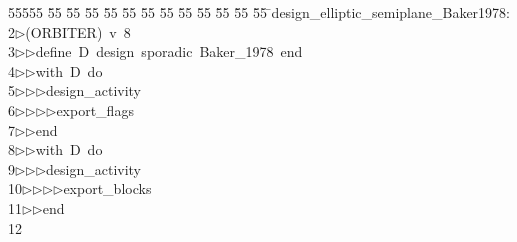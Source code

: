 %
%
\begin{tabbing}
55555 \= 55 \= 55 \= 55 \= 55 \= 55 \= 55 \= 55 \= 55 \= 55 \= 55 \= 55 \= 55 \= \>design\_elliptic\_semiplane\_Baker1978:\\[0pt]
2\>$\triangleright$\>(ORBITER)\ v\ 8\ \\[0pt]
3\>$\triangleright$\>$\triangleright$\>define\ D\ design\ sporadic\ Baker\_1978\ end\ \\[0pt]
4\>$\triangleright$\>$\triangleright$\>with\ D\ do\ \\[0pt]
5\>$\triangleright$\>$\triangleright$\>$\triangleright$\>design\_activity\ \\[0pt]
6\>$\triangleright$\>$\triangleright$\>$\triangleright$\>$\triangleright$\>export\_flags\ \\[0pt]
7\>$\triangleright$\>$\triangleright$\>end\ \\[0pt]
8\>$\triangleright$\>$\triangleright$\>with\ D\ do\ \\[0pt]
9\>$\triangleright$\>$\triangleright$\>$\triangleright$\>design\_activity\ \\[0pt]
10\>$\triangleright$\>$\triangleright$\>$\triangleright$\>$\triangleright$\>export\_blocks\ \\[0pt]
11\>$\triangleright$\>$\triangleright$\>end\\[0pt]
12\>\end{tabbing}

